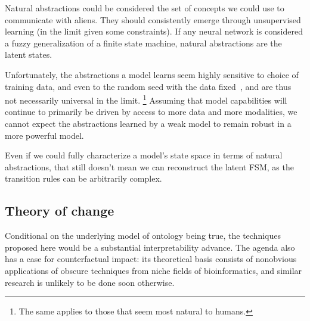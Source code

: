 Natural abstractions could be considered the set of concepts we could use to communicate with aliens. 
They should consistently emerge through unsupervised learning (in the limit given some constraints).
If any neural network is considered a fuzzy generalization of a finite state machine, 
natural abstractions are the latent states.

Unfortunately, the abstractions a model learns seem highly sensitive to choice of training data, and even to the random seed with the data fixed~\cite{chughtai2023}, and are thus not necessarily universal in the limit.
\footnote{The same applies to those that seem most natural to humans.}
Assuming that model capabilities will continue to primarily be driven by access to more data and more modalities, we cannot expect the abstractions learned by a weak model to remain robust in a more powerful model.

Even if we could fully characterize a model's state space in terms of natural abstractions,
that still doesn't mean we can reconstruct the latent FSM, 
as the transition rules can be arbitrarily complex.


\subsection{Theory of change}
Conditional on the underlying model of ontology being true, the
techniques proposed here would be a substantial interpretability
advance. The agenda also has a case for counterfactual impact: its
theoretical basis consists of nonobvious applications of obscure
techniques from niche fields of bioinformatics, and similar research
is unlikely to be done soon otherwise.

